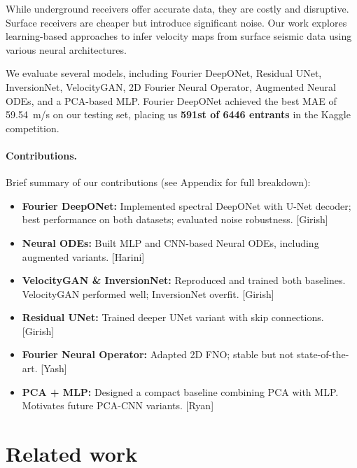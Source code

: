 \documentclass{article}
\newcommand{\instructions}[1]{{\color{blue} #1}}
\begin{document}
While underground receivers offer accurate data, they are costly and disruptive. Surface receivers are cheaper but introduce significant noise. Our work explores learning-based approaches to infer velocity maps from surface seismic data using various neural architectures.

We evaluate several models, including Fourier DeepONet, Residual UNet, InversionNet, VelocityGAN, 2D Fourier Neural Operator, Augmented Neural ODEs, and a PCA-based MLP. Fourier DeepONet achieved the best MAE of 59.54~m/s on our testing set, placing us \textbf{591st of 6446 entrants} in the Kaggle competition.

\paragraph{Contributions.}
Brief summary of our contributions (see Appendix for full breakdown):

\begin{itemize}[leftmargin=1.2em, itemsep=0.4em]
    \item \textbf{Fourier DeepONet:} Implemented spectral DeepONet with U-Net decoder; best performance on both datasets; evaluated noise robustness. [Girish]
    \item \textbf{Neural ODEs:} Built MLP and CNN-based Neural ODEs, including augmented variants. [Harini]
    \item \textbf{VelocityGAN \& InversionNet:} Reproduced and trained both baselines. VelocityGAN performed well; InversionNet overfit. [Girish]
    \item \textbf{Residual UNet:} Trained deeper UNet variant with skip connections. [Girish]
    \item \textbf{Fourier Neural Operator:} Adapted 2D FNO; stable but not state-of-the-art. [Yash]
    \item \textbf{PCA + MLP:} Designed a compact baseline combining PCA with MLP. Motivates future PCA-CNN variants. [Ryan]
\end{itemize}

\section{Related work} 
\end{document}
